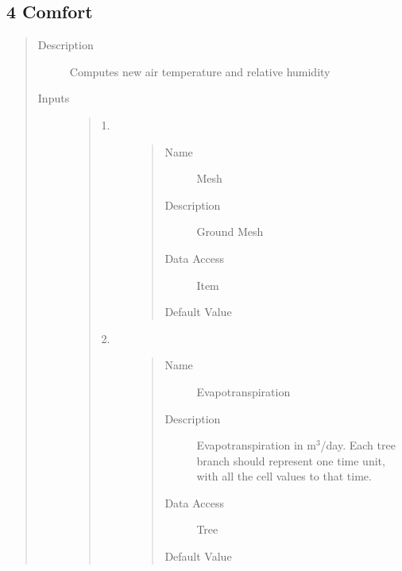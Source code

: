 \documentclass[letterpaper,10pt,english]{sphinxmanual}
\begin{document}
\subsection{4 \textbar{} Comfort}
\label{\detokenize{components:comfort}}
\begin{quote}\begin{description}
\item[{Description}] \leavevmode
Computes new air temperature and relative humidity

\item[{Inputs}] \leavevmode\begin{quote}\begin{description}
\item[{1.}] \leavevmode\begin{quote}\begin{description}
\item[{Name}] \leavevmode
Mesh

\item[{Description}] \leavevmode
Ground Mesh

\item[{Data Access}] \leavevmode
Item

\item[{Default Value}] \leavevmode
{}

\end{description}\end{quote}

\item[{2.}] \leavevmode\begin{quote}\begin{description}
\item[{Name}] \leavevmode
Evapotranspiration

\item[{Description}] \leavevmode
Evapotranspiration in m$^{\text{3}}$/day.
Each tree branch should represent one time unit, with all the cell values to that time.

\item[{Data Access}] \leavevmode
Tree

\item[{Default Value}] \leavevmode
{}


\end{description}
\end{quote}
\end{description}
\end{quote}
\end{description}
\end{quote}
\end{document}
